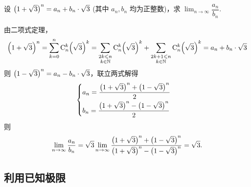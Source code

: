 \begin{example}
    设 \(\qty(1+\sqrt{3})^n=a_n+b_n\cdot\sqrt{3}\) (其中 \(a_n,b_n\) 均为正整数)，求 $\displaystyle\lim_{n\to\infty}\dfrac{a_n}{b_n}.$
\end{example}
\begin{solution}
    由二项式定理，$$\qty(1+\sqrt{3})^n=\sum_{k=0}^{n}\mathrm{C}_n^k\qty(\sqrt{3})^k=\sum_{\substack{2k\leqslant n\\k\in\mathbb{N}}}\mathrm{C}_n^k\qty(\sqrt{3})^k+\sum_{\substack{2k+1\leqslant n\\k\in\mathbb{N}}}\mathrm{C}_n^k\qty(\sqrt{3})^k=a_n+b_n\cdot\sqrt{3}$$
    则 $\qty(1-\sqrt{3})^n=a_n-b_n\cdot \sqrt{3}$，联立两式解得
    $$\begin{cases}
            a_n=\dfrac{\qty(1+\sqrt{3})^n+\qty(1-\sqrt{3})^n}{2} \\[6pt]
            b_n=\dfrac{\qty(1+\sqrt{3})^n-\qty(1-\sqrt{3})^n}{2}
        \end{cases}$$
    则 $$\lim_{n\to\infty}\dfrac{a_n}{b_n}=\sqrt{3}\lim_{n\to\infty}\dfrac{\qty(1+\sqrt{3})^n+\qty(1-\sqrt{3})^n}{\qty(1+\sqrt{3})^n-\qty(1-\sqrt{3})^n}=\sqrt{3}.$$
\end{solution}

\subsection{利用已知极限}

